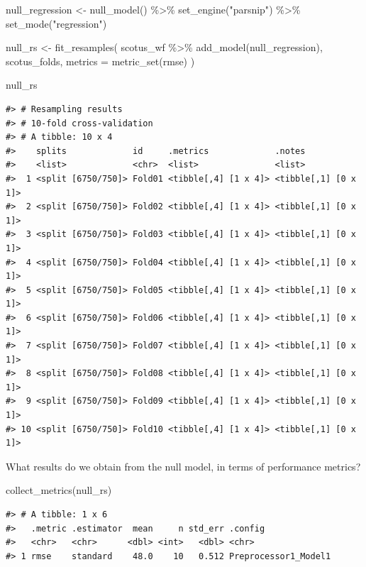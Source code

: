 \documentclass[
]{krantz}
\makeatletter
\newenvironment{Shaded}{\begin{snugshade}}{\end{snugshade}}
\newcommand{\AttributeTok}[1]{\textcolor[rgb]{0.77,0.63,0.00}{#1}}
\newcommand{\FunctionTok}[1]{\textcolor[rgb]{0.00,0.00,0.00}{#1}}
\newcommand{\NormalTok}[1]{#1}
\newcommand{\OtherTok}[1]{\textcolor[rgb]{0.56,0.35,0.01}{#1}}
\newcommand{\SpecialCharTok}[1]{\textcolor[rgb]{0.00,0.00,0.00}{#1}}
\newcommand{\StringTok}[1]{\textcolor[rgb]{0.31,0.60,0.02}{#1}}
\newenvironment{kframe}{%
\medskip{}
\setlength{\fboxsep}{.8em}
 \def\at@end@of@kframe{}%
 \ifinner\ifhmode%
  \def\at@end@of@kframe{\end{minipage}}%
  \begin{minipage}{\columnwidth}%
 \fi\fi%
 \def\FrameCommand##1{\hskip\@totalleftmargin \hskip-\fboxsep
 \colorbox{shadecolor}{##1}\hskip-\fboxsep
     \hskip-\linewidth \hskip-\@totalleftmargin \hskip\columnwidth}%
 \MakeFramed {\advance\hsize-\width
   \@totalleftmargin\z@ \linewidth\hsize
   \@setminipage}}%
 {\par\unskip\endMakeFramed%
 \at@end@of@kframe}
\renewenvironment{Shaded}{\begin{kframe}}{\end{kframe}}
\makeatother
\begin{document}
\begin{Shaded}
\begin{Highlighting}[]
\NormalTok{null\_regression }\OtherTok{\textless{}{-}} \FunctionTok{null\_model}\NormalTok{() }\SpecialCharTok{\%\textgreater{}\%}
  \FunctionTok{set\_engine}\NormalTok{(}\StringTok{"parsnip"}\NormalTok{) }\SpecialCharTok{\%\textgreater{}\%}
  \FunctionTok{set\_mode}\NormalTok{(}\StringTok{"regression"}\NormalTok{)}

\NormalTok{null\_rs }\OtherTok{\textless{}{-}} \FunctionTok{fit\_resamples}\NormalTok{(}
\NormalTok{  scotus\_wf }\SpecialCharTok{\%\textgreater{}\%} \FunctionTok{add\_model}\NormalTok{(null\_regression),}
\NormalTok{  scotus\_folds,}
  \AttributeTok{metrics =} \FunctionTok{metric\_set}\NormalTok{(rmse)}
\NormalTok{)}

\NormalTok{null\_rs}
\end{Highlighting}
\end{Shaded}

\begin{verbatim}
#> # Resampling results
#> # 10-fold cross-validation 
#> # A tibble: 10 x 4
#>    splits             id     .metrics             .notes              
#>    <list>             <chr>  <list>               <list>              
#>  1 <split [6750/750]> Fold01 <tibble[,4] [1 x 4]> <tibble[,1] [0 x 1]>
#>  2 <split [6750/750]> Fold02 <tibble[,4] [1 x 4]> <tibble[,1] [0 x 1]>
#>  3 <split [6750/750]> Fold03 <tibble[,4] [1 x 4]> <tibble[,1] [0 x 1]>
#>  4 <split [6750/750]> Fold04 <tibble[,4] [1 x 4]> <tibble[,1] [0 x 1]>
#>  5 <split [6750/750]> Fold05 <tibble[,4] [1 x 4]> <tibble[,1] [0 x 1]>
#>  6 <split [6750/750]> Fold06 <tibble[,4] [1 x 4]> <tibble[,1] [0 x 1]>
#>  7 <split [6750/750]> Fold07 <tibble[,4] [1 x 4]> <tibble[,1] [0 x 1]>
#>  8 <split [6750/750]> Fold08 <tibble[,4] [1 x 4]> <tibble[,1] [0 x 1]>
#>  9 <split [6750/750]> Fold09 <tibble[,4] [1 x 4]> <tibble[,1] [0 x 1]>
#> 10 <split [6750/750]> Fold10 <tibble[,4] [1 x 4]> <tibble[,1] [0 x 1]>
\end{verbatim}

What results do we obtain from the null model, in terms of performance metrics?

\begin{Shaded}
\begin{Highlighting}[]
\FunctionTok{collect\_metrics}\NormalTok{(null\_rs)}
\end{Highlighting}
\end{Shaded}

\begin{verbatim}
#> # A tibble: 1 x 6
#>   .metric .estimator  mean     n std_err .config             
#>   <chr>   <chr>      <dbl> <int>   <dbl> <chr>               
#> 1 rmse    standard    48.0    10   0.512 Preprocessor1_Model1
\end{verbatim}
\end{document}
